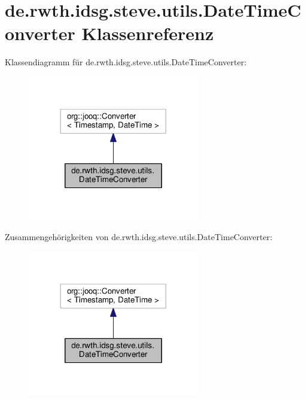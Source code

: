 \hypertarget{classde_1_1rwth_1_1idsg_1_1steve_1_1utils_1_1_date_time_converter}{\section{de.\-rwth.\-idsg.\-steve.\-utils.\-Date\-Time\-Converter Klassenreferenz}
\label{classde_1_1rwth_1_1idsg_1_1steve_1_1utils_1_1_date_time_converter}
}


Klassendiagramm für de.\-rwth.\-idsg.\-steve.\-utils.\-Date\-Time\-Converter\-:\nopagebreak
\begin{figure}[H]
\begin{center}
\leavevmode
\includegraphics[width=212pt]{classde_1_1rwth_1_1idsg_1_1steve_1_1utils_1_1_date_time_converter__inherit__graph}
\end{center}
\end{figure}


Zusammengehörigkeiten von de.\-rwth.\-idsg.\-steve.\-utils.\-Date\-Time\-Converter\-:\nopagebreak
\begin{figure}[H]
\begin{center}
\leavevmode
\includegraphics[width=212pt]{classde_1_1rwth_1_1idsg_1_1steve_1_1utils_1_1_date_time_converter__coll__graph}
\end{center}
\end{figure}
